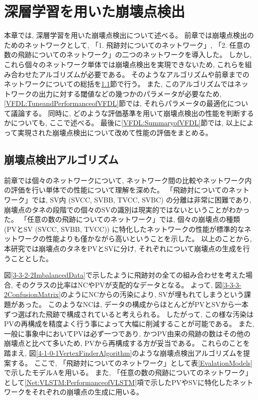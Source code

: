 
\chapter{深層学習を用いた崩壊点検出} \label{chap:VertexFinderwithDL}

本章では, 深層学習を用いた崩壊点検出について述べる。
前章では崩壊点検出のためのネットワークとして, 「1. 飛跡対についてのネットワーク」, 「2. 任意の数の飛跡についてのネットワーク」の二つのネットワークを導入した。
しかし, これら個々のネットワーク単体では崩壊点検出を実現できないため, これらを組み合わせたアルゴリズムが必要である。
そのようなアルゴリズムや前章までのネットワークについての総括を\ref{VFDL:AlgorithmofVFDL}節で行う。
また, このアルゴリズムではネットワークの出力に対する閾値などの幾つかのパラメータが必要なため, \ref{VFDL:TuneandPerformanceofVFDL}節では, それらパラメータの最適化について議論する。
同時に, どのような評価基準を用いて崩壊点検出の性能を判断するかについても, ここで述べる。
最後に\ref{VFDL:SummaryofVFDL}節では, 以上によって実現された崩壊点検出について改めて性能の評価をまとめる。


\section{崩壊点検出アルゴリズム} \label{VFDL:AlgorithmofVFDL}

前章では個々のネットワークについて, ネットワーク間の比較やネットワーク内の評価を行い単体での性能について理解を深めた。
「飛跡対についてのネットワーク」では, SV内 (SVCC, SVBB, TVCC, SVBC) の分離は非常に困難であり, 崩壊点のタネの段階での個々のSVの識別は現実的ではないということがわかった。
「任意の数の飛跡についてのネットワーク」では, 個々の崩壊点の種類 (PVとSV (SVCC, SVBB, TVCC)) に特化したネットワークの性能が標準的なネットワークの性能よりも僅かながら高いということを示した。
以上のことから, 本研究では崩壊点のタネをPVとSVに分け, それぞれについて崩壊点の生成を行うこととした。

図\ref{3-3-2-2ImbalancedData}で示したように飛跡対の全ての組み合わせを考えた場合, そのクラスの比率はNCやPVが支配的なデータとなる。
よって, 図\ref{3-3-3-2ConfusionMatrix}のようにNCからの汚染により, SVが埋もれてしまうという課題があった。
このようなNCは, データの構成からほとんどがPVとSVから一本ずつ選ばれた飛跡で構成されていると考えられる。
したがって, この様な汚染はPVの再構成を精度よく行う事によって大幅に削減することが可能である。
また, 一般に事象中においてPVは必ず一つであり, かつPV由来の飛跡の数はその他の崩壊点と比べて多いため, PVから再構成する方が妥当である。
これらのことを踏まえ, 図\ref{4-1-0-1VertexFinderAlgorithm}のような崩壊点検出アルゴリズムを提案する。
ここで, 「飛跡対についてのネットワーク」として表\ref{EvalationModels}で示したモデルAを用いる。
また, 「任意の数の飛跡についてのネットワーク」として\ref{Net:VLSTM:PerformanceofVLSTM}項で示したPVやSVに特化したネットワークをそれぞれの崩壊点の生成に用いる。

